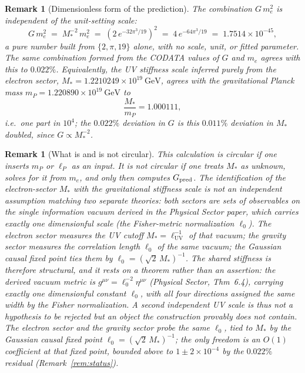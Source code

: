 \documentclass[11pt]{article}
\newtheorem{remark}[definition]{Remark}
\begin{document}
\begin{remark}[Dimensionless form of the prediction]
The combination $G\,m_e^2$ is independent of the unit-setting scale:
\begin{equation}
G\,m_e^2\;=\;M_*^{-2}\,m_e^2\;=\;\left(2\,e^{-32\pi^3/19}\right)^2
\;=\;4\,e^{-64\pi^3/19}\;=\;1.7514\times10^{-45},
\end{equation}
a pure number built from $\{2,\pi,19\}$ alone, with no scale, unit, or fitted parameter. The same combination formed from the CODATA values of $G$ and $m_e$ agrees with this to $0.022\%$. Equivalently, the UV stiffness scale inferred purely from the electron sector, $M_*=1.2210249\times10^{19}\ \mathrm{GeV}$, agrees with the gravitational Planck mass $m_P=1.220890\times10^{19}\ \mathrm{GeV}$ to
\begin{equation}
\frac{M_*}{m_P}=1.000111,
\end{equation}
i.e.\ one part in $10^4$; the $0.022\%$ deviation in $G$ is this $0.011\%$ deviation in $M_*$ doubled, since $G\propto M_*^{-2}$.
\end{remark}

\begin{remark}[What is and is not circular]
This calculation is circular if one inserts $m_P$ or $\ell_P$ as an input. It is not circular if one treats $M_*$ as unknown, solves for it from $m_e$, and only then computes $G_{\rm pred}$. The identification of the electron-sector $M_*$ with the gravitational stiffness scale is \emph{not} an independent assumption matching two separate theories: both sectors are sets of observables on the \emph{single} information vacuum derived in the \emph{Physical Sector} paper, which carries exactly one dimensionful scale (the Fisher-metric normalization $\ell_0$). The electron sector measures the UV cutoff $M_*=\ell_{\mathrm{UV}}^{-1}$ of that vacuum; the gravity sector measures the correlation length $\ell_0$ of the same vacuum; the Gaussian causal fixed point ties them by $\ell_0=(\sqrt2\,M_*)^{-1}$. The shared stiffness is therefore structural, and it rests on a theorem rather than an assertion: the derived vacuum metric is $g^{\mu\nu}=\ell_0^{-2}\eta^{\mu\nu}$ (\emph{Physical Sector}, Thm~6.4), carrying exactly one dimensionful constant $\ell_0$, with all four directions assigned the same width by the Fisher normalization. A second independent UV scale is thus not a hypothesis to be rejected but an object the construction provably does not contain. The electron sector and the gravity sector probe the same $\ell_0$, tied to $M_*$ by the Gaussian causal fixed point $\ell_0=(\sqrt2\,M_*)^{-1}$; the only freedom is an $O(1)$ coefficient at that fixed point, bounded above to $1\pm2\times10^{-4}$ by the $0.022\%$ residual (Remark~\ref{rem:status}).
\end{remark}
\end{document}
